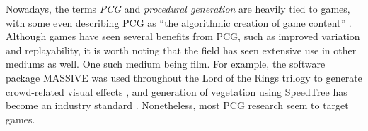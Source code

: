 Nowadays, the terms \textit{PCG} and \textit{procedural generation} are heavily tied to games, with some even describing PCG as ``the algorithmic creation of game content'' \cite[p.1]{pcg_in_games}.
Although games have seen several benefits from PCG, such as improved variation and replayability, it is worth noting that the field has seen extensive use in other mediums as well.
One such medium being film.
For example, the software package MASSIVE was used throughout the Lord of the Rings trilogy to generate crowd-related visual effects \cite{massive}, and generation of vegetation using SpeedTree has become an industry standard \cite{speedtree_cinema}.
Nonetheless, most PCG research seem to target games.
